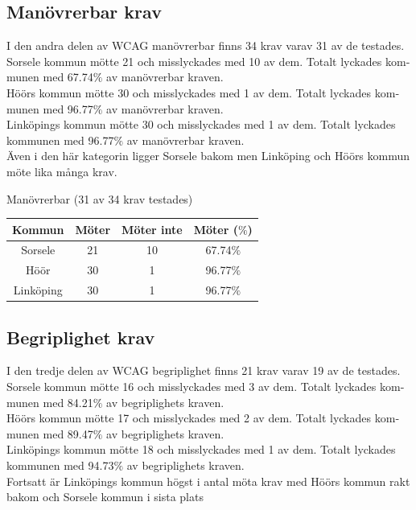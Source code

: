 \documentclass[11p]{article}
\begin{document}
\begin{otherlanguage}{swedish}
    \subsection{Manövrerbar krav}
    I den andra delen av WCAG manövrerbar finns 34 krav varav 31 av de testades.
    Sorsele kommun mötte 21 och misslyckades med 10 av dem.
    Totalt lyckades kommunen med 67.74$\%$ av manövrerbar kraven.
    \\Höörs kommun mötte 30 och misslyckades med 1 av dem.
    Totalt lyckades kommunen med 96.77$\%$ av manövrerbar kraven.
    \\Linköpings kommun mötte 30 och misslyckades med 1 av dem.
    Totalt lyckades kommunen med 96.77$\%$ av manövrerbar kraven.
    \\Även i den här kategorin ligger Sorsele bakom men Linköping och Höörs kommun möte lika många krav.

    \begin{center}
    Manövrerbar (31 av 34 krav testades)

    \begin{tabular}{ |c|c|c|c|}
        \hline
        Kommun & Möter & Möter inte & Möter ($\%$) \\  \hline
        Sorsele & 21 & 10 & 67.74$\%$ \\ \hline
        Höör & 30 & 1 & 96.77$\%$ \\ \hline
        Linköping & 30 & 1 & 96.77$\%$ \\ \hline
    \end{tabular}
    \end{center}

    \subsection{Begriplighet krav}
    I den tredje delen av WCAG begriplighet finns 21 krav varav 19 av de testades.
    Sorsele kommun mötte 16 och misslyckades med 3 av dem.
    Totalt lyckades kommunen med 84.21$\%$ av begriplighets kraven.
    \\Höörs kommun mötte 17 och misslyckades med 2 av dem.
    Totalt lyckades kommunen med 89.47$\%$ av begriplighets kraven.
    \\Linköpings kommun mötte 18 och misslyckades med 1 av dem.
    Totalt lyckades kommunen med 94.73$\%$ av begriplighets kraven.
    \\Fortsatt är Linköpings kommun högst i antal möta krav med Höörs kommun rakt bakom och Sorsele kommun i sista plats


\end{otherlanguage}
\end{document}
